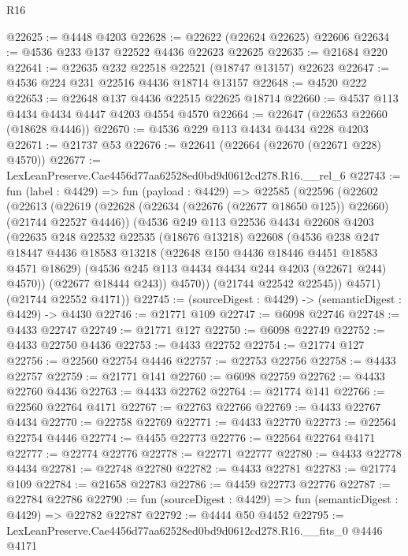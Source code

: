 \begin{lexlean}{R16}
\begin{coremodule}
@22625 := @4448 @4203
@22628 := @22622 (@22624 @22625) @22606
@22634 := @4536 @233 @137 @22522 @4436 @22623 @22625
@22635 := @21684 @220
@22641 := @22635 @232 @22518 @22521 (@18747 @13157) @22623
@22647 := @4536 @224 @231 @22516 @4436 @18714 @13157
@22648 := @4520 @222
@22653 := @22648 @137 @4436 @22515 @22625 @18714
@22660 := @4537 @113 @4434 @4434 @4447 @4203 @4554 @4570
@22664 := @22647 (@22653 @22660 (@18628 @4446))
@22670 := @4536 @229 @113 @4434 @4434 @228 @4203
@22671 := @21737 @53
@22676 := @22641 (@22664 (@22670 (@22671 @228) @4570))
@22677 := LexLeanPreserve.Cae4456d77aa62528ed0bd9d0612cd278.R16.__rel_6
@22743 := fun (label : @4429) =>
  fun (payload : @4429) =>
  @22585
    (@22596
      (@22602
        (@22613
          (@22619
            (@22628 (@22634 (@22676 (@22677 @18650 @125)) @22660) (@21744 @22527 @4446))
            (@4536
              @249
              @113
              @22536
              @4434
              @22608
              @4203
              (@22635
                @248
                @22532
                @22535
                (@18676 @13218)
                @22608
                (@4536
                  @238
                  @247
                  @18447
                  @4436
                  @18583
                  @13218
                  (@22648 @150 @4436 @18446 @4451 @18583 @4571 @18629)
                  (@4536 @245 @113 @4434 @4434 @244 @4203 (@22671 @244) @4570))
                (@22677 @18444 @243))
              @4570))
          (@21744 @22542 @22545))
        @4571)
      (@21744 @22552 @4171))
@22745 := (sourceDigest : @4429) -> (semanticDigest : @4429) -> @4430
@22746 := @21771 @109
@22747 := @6098 @22746
@22748 := @4433 @22747
@22749 := @21771 @127
@22750 := @6098 @22749
@22752 := @4433 @22750 @4436
@22753 := @4433 @22752
@22754 := @21774 @127
@22756 := @22560 @22754 @4446
@22757 := @22753 @22756
@22758 := @4433 @22757
@22759 := @21771 @141
@22760 := @6098 @22759
@22762 := @4433 @22760 @4436
@22763 := @4433 @22762
@22764 := @21774 @141
@22766 := @22560 @22764 @4171
@22767 := @22763 @22766
@22769 := @4433 @22767 @4434
@22770 := @22758 @22769
@22771 := @4433 @22770
@22773 := @22564 @22754 @4446
@22774 := @4455 @22773
@22776 := @22564 @22764 @4171
@22777 := @22774 @22776
@22778 := @22771 @22777
@22780 := @4433 @22778 @4434
@22781 := @22748 @22780
@22782 := @4433 @22781
@22783 := @21774 @109
@22784 := @21658 @22783
@22786 := @4459 @22773 @22776
@22787 := @22784 @22786
@22790 := fun (sourceDigest : @4429) => fun (semanticDigest : @4429) => @22782 @22787
@22792 := @4444 @50 @4452
@22795 := LexLeanPreserve.Cae4456d77aa62528ed0bd9d0612cd278.R16.__fits_0 @4446 @4171

\end{coremodule}
\end{lexlean}
